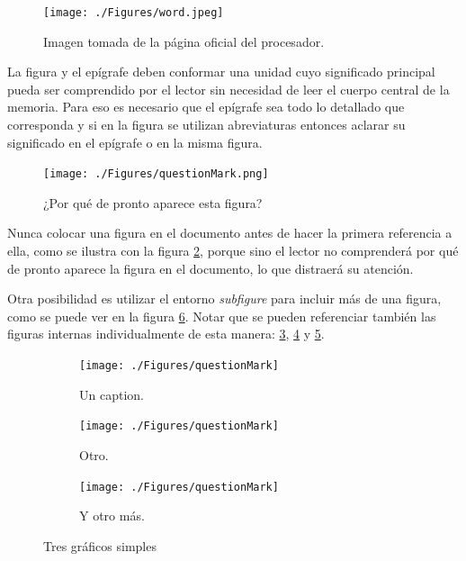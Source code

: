 \begin{figure}[htpb]
	\centering
	\texttt{[image: ./Figures/word.jpeg]}
	\caption{Imagen tomada de la página oficial del procesador\protect\footnotemark.}
	\label{fig:palabraIngles}
\end{figure}


La figura y el epígrafe deben conformar una unidad cuyo significado principal pueda ser comprendido por el lector sin necesidad de leer el cuerpo central de la memoria. Para eso es necesario que el epígrafe sea todo lo detallado que corresponda y si en la figura se utilizan abreviaturas entonces aclarar su significado en el epígrafe o en la misma figura.



\begin{figure}[ht]
	\centering
	\texttt{[image: ./Figures/questionMark.png]}
	\caption{¿Por qué de pronto aparece esta figura?}
	\label{fig:questionMark}
\end{figure}

Nunca colocar una figura en el documento antes de hacer la primera referencia a ella, como se ilustra con la figura \ref{fig:questionMark}, porque sino el lector no comprenderá por qué de pronto aparece la figura en el documento, lo que distraerá su atención.

Otra posibilidad es utilizar el entorno \textit{subfigure} para incluir más de una figura, como se puede ver en la figura \ref{fig:three graphs}. Notar que se pueden referenciar también las figuras internas individualmente de esta manera: \ref{fig:1de3}, \ref{fig:2de3} y \ref{fig:3de3}.
 
\begin{figure}[!htpb]
     \centering
     \begin{subfigure}[b]{0.3\textwidth}
         \centering
         \texttt{[image: ./Figures/questionMark]}
         \caption{Un caption.}
         \label{fig:1de3}
     \end{subfigure}
     \hfill
     \begin{subfigure}[b]{0.3\textwidth}
         \centering
         \texttt{[image: ./Figures/questionMark]}
         \caption{Otro.}
         \label{fig:2de3}
     \end{subfigure}
     \hfill
     \begin{subfigure}[b]{0.3\textwidth}
         \centering
         \texttt{[image: ./Figures/questionMark]}
         \caption{Y otro más.}
         \label{fig:3de3}
     \end{subfigure}
        \caption{Tres gráficos simples}
        \label{fig:three graphs}
\end{figure}

